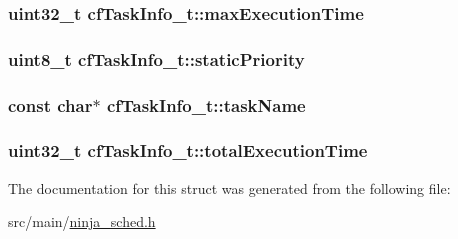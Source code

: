 \hypertarget{structcfTaskInfo__t_a42f42d3106a25a926cecb2f904702ff2}{
\subsubsection[{max\+Execution\+Time}]{\setlength{\rightskip}{0pt plus 5cm}uint32\+\_\+t cf\+Task\+Info\+\_\+t\+::max\+Execution\+Time}}\label{structcfTaskInfo__t_a42f42d3106a25a926cecb2f904702ff2}
\hypertarget{structcfTaskInfo__t_a6a78cca089c4c76de82c650f042d8282}{
\subsubsection[{static\+Priority}]{\setlength{\rightskip}{0pt plus 5cm}uint8\+\_\+t cf\+Task\+Info\+\_\+t\+::static\+Priority}}\label{structcfTaskInfo__t_a6a78cca089c4c76de82c650f042d8282}
\hypertarget{structcfTaskInfo__t_a01204081890201741afd6148cea6c9c1}{
\subsubsection[{task\+Name}]{\setlength{\rightskip}{0pt plus 5cm}const char$\ast$ cf\+Task\+Info\+\_\+t\+::task\+Name}}\label{structcfTaskInfo__t_a01204081890201741afd6148cea6c9c1}
\hypertarget{structcfTaskInfo__t_a1d67957929ae433be085102618f3ac80}{
\subsubsection[{total\+Execution\+Time}]{\setlength{\rightskip}{0pt plus 5cm}uint32\+\_\+t cf\+Task\+Info\+\_\+t\+::total\+Execution\+Time}}\label{structcfTaskInfo__t_a1d67957929ae433be085102618f3ac80}


The documentation for this struct was generated from the following file\+:\begin{DoxyCompactItemize}
\item 
src/main/\hyperlink{ninja__sched_8h}{ninja\+\_\+sched.\+h}\end{DoxyCompactItemize}
